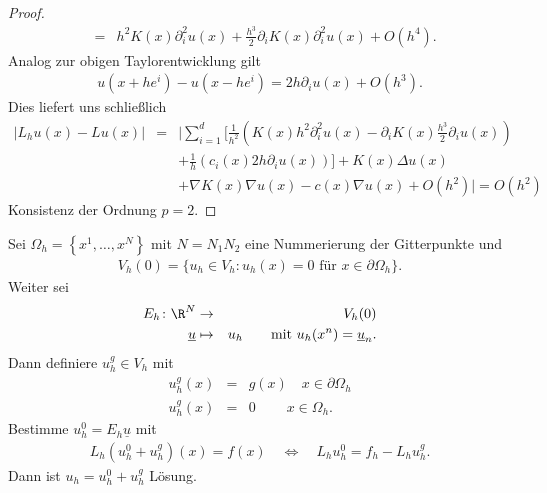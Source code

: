 \begin{proof}
\begin{eqnarray*}
        &=& h^2 K(x) \partial_i^2 u(x) + \frac{h^3}{2} \partial_i K(x)
            \partial_i^2 u(x) + O(h^4).
    \end{eqnarray*}
    Analog zur obigen Taylorentwicklung gilt
    \begin{eqnarray*}
        u\left(x + h e^i\right) - u\left(x - h e^i\right)
        = 2 h \partial_i u(x) + O(h^3).
    \end{eqnarray*}
    Dies liefert uns schlie\ss{}lich
    \begin{eqnarray*}
            |L_h u(x) - Lu(x)|
        &=& \Biggl|\sum_{i=1}^d \Biggl[\frac{1}{h^2} \left(K(x) h^2
            \partial_i^2 u(x)
            - \partial_i K(x) \frac{h^3}{2} \partial_i u(x)\right) \\
            &&+ \frac{1}{h} (c_i(x) 2 h \partial_i u(x))\Biggr]
            + K(x) \Delta u(x) \\
            &&+ \nabla K(x) \nabla u(x) - c(x) \nabla u(x) + O(h^2)\Biggr|
         =  O(h^2)
    \end{eqnarray*}
    Konsistenz der Ordnung $p = 2$.
\end{proof}


\begin{Implementation}
    Sei $\Omega_h = \left\{x^1, \dots, x^N\right\}$ mit $N = N_1 N_2$ eine
    Nummerierung der Gitterpunkte und
    \begin{eqnarray*}
          V_h(0)
        = \{u_h\in V_h \colon u_h(x) = 0 \text{ für } x\in \partial\Omega_h\}.
    \end{eqnarray*}
    Weiter sei
    \begin{eqnarray*}
        E_h \colon \R^N &\to& V_h(0) \\
        \underline u &\mapsto& u_h \qquad \text{mit } u_h(x^n)
        = \underline u_n.
    \end{eqnarray*}
    Dann definiere $u_h^g\in V_h$ mit
    \begin{eqnarray*}
        u_h^g(x) &=& g(x) \quad x\in \partial\Omega_h \\
        u_h^g(x) &=& 0 \quad \ \quad x\in \Omega_h.
    \end{eqnarray*}
    Bestimme $u_h^0 = E_h\underline u$ mit
    \begin{eqnarray*}
        L_h \left(u_h^0 + u_h^g\right)(x) = f(x) \quad \Leftrightarrow \quad
        L_h u_h^0 = f_h - L_h u_h^g.
    \end{eqnarray*}
    Dann ist $u_h = u_h^0 + u_h^g$ Lösung.
\end{Implementation}


